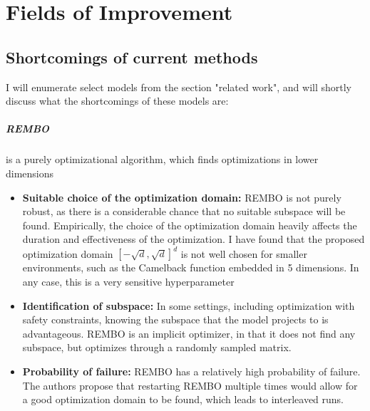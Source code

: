 \chapter{Fields of Improvement}

\ifpdf
    \graphicspath{{Chapter3/Figs/Raster/}{Chapter3/Figs/PDF/}{Chapter3/Figs/}}
\else
    \graphicspath{{Chapter3/Figs/Vector/}{Chapter3/Figs/}}
\fi

\section{Shortcomings of current methods}
I will enumerate select models from the section "related work", and will shortly discuss what the shortcomings of these models are:

\paragraph{REMBO} is a purely optimizational algorithm, which finds optimizations in lower dimensions

\begin{itemize}

\item \textbf{Suitable choice of the optimization domain:} REMBO is not purely robust, as there is a considerable chance that no suitable subspace will be found. 
Empirically, the choice of the optimization domain heavily affects the duration and effectiveness of the optimization.
I have found that the proposed optimization domain $ \left[ -\sqrt{d}, \sqrt{d}  \right]^d $ is not well chosen for smaller environments, such as the Camelback function embedded in 5 dimensions.
In any case, this is a very sensitive hyperparameter

\item \textbf{Identification of subspace:} In some settings, including optimization with safety constraints, knowing the subspace that the model projects to is advantageous. 
REMBO is an implicit optimizer, in that it does not find any subspace, but optimizes through a randomly sampled matrix.

\item \textbf{Probability of failure:} REMBO has a relatively high probability of failure. 
The authors propose that restarting REMBO multiple times would allow for a good optimization domain to be found, which leads to interleaved runs. 

\end{itemize}

